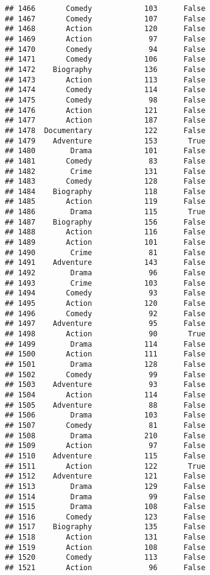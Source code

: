\documentclass[
]{article}
\begin{document}
\begin{verbatim}
## 1466       Comedy            103      False
## 1467       Comedy            107      False
## 1468       Action            120      False
## 1469       Action             97      False
## 1470       Comedy             94      False
## 1471       Comedy            106      False
## 1472    Biography            136      False
## 1473       Action            113      False
## 1474       Comedy            114      False
## 1475       Comedy             98      False
## 1476       Action            121      False
## 1477       Action            187      False
## 1478  Documentary            122      False
## 1479    Adventure            153       True
## 1480        Drama            101      False
## 1481       Comedy             83      False
## 1482        Crime            131      False
## 1483       Comedy            128      False
## 1484    Biography            118      False
## 1485       Action            119      False
## 1486        Drama            115       True
## 1487    Biography            156      False
## 1488       Action            116      False
## 1489       Action            101      False
## 1490        Crime             81      False
## 1491    Adventure            143      False
## 1492        Drama             96      False
## 1493        Crime            103      False
## 1494       Comedy             93      False
## 1495       Action            120      False
## 1496       Comedy             92      False
## 1497    Adventure             95      False
## 1498       Action             90       True
## 1499        Drama            114      False
## 1500       Action            111      False
## 1501        Drama            128      False
## 1502       Comedy             99      False
## 1503    Adventure             93      False
## 1504       Action            114      False
## 1505    Adventure             88      False
## 1506        Drama            103      False
## 1507       Comedy             81      False
## 1508        Drama            210      False
## 1509       Action             97      False
## 1510    Adventure            115      False
## 1511       Action            122       True
## 1512    Adventure            121      False
## 1513        Drama            129      False
## 1514        Drama             99      False
## 1515        Drama            108      False
## 1516       Comedy            123      False
## 1517    Biography            135      False
## 1518       Action            131      False
## 1519       Action            108      False
## 1520       Comedy            113      False
## 1521       Action             96      False

\end{verbatim}
\end{document}
